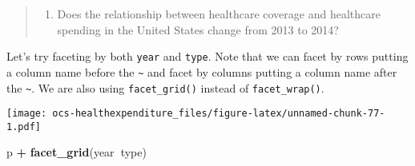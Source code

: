 \documentclass[]{article}
\newenvironment{Shaded}{\begin{snugshade}}{\end{snugshade}}
\newcommand{\DataTypeTok}[1]{\textcolor[rgb]{0.13,0.29,0.53}{#1}}
\newcommand{\KeywordTok}[1]{\textcolor[rgb]{0.13,0.29,0.53}{\textbf{#1}}}
\newcommand{\NormalTok}[1]{#1}
\newcommand{\OperatorTok}[1]{\textcolor[rgb]{0.81,0.36,0.00}{\textbf{#1}}}
\newcommand{\StringTok}[1]{\textcolor[rgb]{0.31,0.60,0.02}{#1}}
\providecommand{\tightlist}{%
  \setlength{\itemsep}{0pt}\setlength{\parskip}{0pt}}
\begin{document}
\begin{quote}
\begin{enumerate}
\def\labelenumi{\arabic{enumi}.}
\setcounter{enumi}{2}
\tightlist
\item
  Does the relationship between healthcare coverage and healthcare
  spending in the United States change from 2013 to 2014?
\end{enumerate}
\end{quote}

Let's try faceting by both \texttt{year} and \texttt{type}. Note that we
can facet by rows putting a column name before the
\texttt{\textasciitilde{}} and facet by columns putting a column name
after the \texttt{\textasciitilde{}}. We are also using
\texttt{facet\_grid()} instead of \texttt{facet\_wrap()}.

\begin{Shaded}
\end{Shaded}

\texttt{[image: ocs-healthexpenditure\_files/figure-latex/unnamed-chunk-77-1.pdf]}

\begin{Shaded}
\begin{Highlighting}[]
\NormalTok{p }\OperatorTok{+}\StringTok{ }\KeywordTok{facet_grid}\NormalTok{(year}\OperatorTok{~}\NormalTok{type)}
\end{Highlighting}
\end{Shaded}
\end{document}
